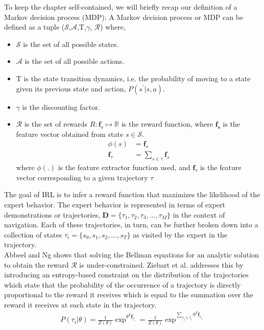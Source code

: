 To keep the chapter self-contained, we will briefly recap our definition of a Markov decision process (MDP):
A Markov decision process or MDP can be defined as a tuple ($\mathcal{S}$,$\mathcal{A}$,T,$\gamma$, $\mathcal{R}$)  where,
\begin{itemize}
    \item $\mathcal{S}$ is the set of all possible states.
    \item $\mathcal{A}$ is the set of all possible actions.
    \item T is the state transition dynamics, i.e. the probability of moving to a state given its previous state and action, $P(s^{'}|s, a)$.
    \item $\gamma$ is the discounting factor.
    \item $\mathcal{R}$ is the set of rewards $R:  \mathbf{f}_{s} \mapsto \mathbb{R} $ is the reward function, where $\mathbf{f_{s}}$ is the feature vector obtained from state $s \in \mathcal{S}$.
    \begin{align}
    \phi(s) &= \mathbf{f}_{s} \\
    \mathbf{f}_{\tau} &= \sum_{s \in \tau} \mathbf{f}_{s}
    \end{align}
    where $\phi(.)$ is the feature extractor function used, and $\mathbf{f}_{\tau}$ is the feature vector corresponding to a given trajectory $\tau$ 
    \end{itemize}  
The goal of IRL is to infer a reward function that maximizes the likelihood of the expert behavior. The expert behavior is represented in terms of expert demonstrations or trajectories, $\mathbf{D} = \{ \tau_1, \tau_2, \tau_3, \dots, 
\tau_{M} \}$ in the context of navigation. Each of these trajectories, in turn, can be further broken down into a collection of states $\tau_{i} = \{ s_{0}, s_{1}, s_{2}, \dots, s_{T} \}$ as visited by the expert in the trajectory. \\ Abbeel and Ng
\cite{abbeel_apprenticeshiplearning_2004} shows that solving the Bellman equations for an analytic solution to obtain the reward $\mathcal{R}$ is under-constrained. Ziebart et al. \cite{ziebart_maxent_2008} addresses this by introducing an entropy-based constraint \cite{jaynes1957information} on the distribution of the trajectories which state that the probability of the occurrence of a trajectory is directly proportional to the reward it receives which is equal to the summation over the reward it receives at each state in the trajectory.
\begin{align}
P(\tau_{i}| \theta) = \frac{1}{Z(\theta)}\exp^{\theta^{T}\mathbf{f}_{\tau_{i}}} = \frac{1}{Z(\theta)}\exp^{\sum_{s_{j}\in\tau_{i}}\theta^{T}\mathbf{f}_{s_{j}}}
\end{align}
